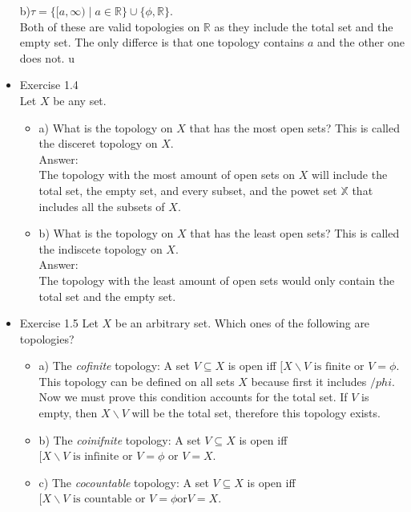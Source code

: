 \documentclass{article}
\begin{document}
\begin{itemize}
        b)$\tau = \{[a, \infty) \mid a \in \mathbb{R}\} \cup \{\phi, \mathbb{R}\}$. \\ 
        Both of these are valid topologies on $\mathbb{R}$ as they include the total set and the empty set. The only differce is that one topology contains $a$ and the other one does not. u
\item Exercise 1.4 \\
    Let $X$ be any set. 
        \begin{itemize}
            \item     a) What is the topology on $X$ that has the most open sets? This is called the disceret topology on $X$. 
                \\ Answer: 
                    \\ The topology with the most amount of open sets on $X$ will include the total set, the empty set, and every subset, and the powet set $\mathbb{X}$ that includes all the subsets of $X$. \\
            \item    b) What is the topology on $X$ that has the least open sets? This is called the indiscete topology on $X$. 
                \\ Answer:
                    \\ The topology with the least amount of open sets would only contain the total set and the empty set. 
            \end{itemize}
                
\item Exercise 1.5 Let $X$ be an arbitrary set. Which ones of the following are topologies?
        \begin{itemize}
            \item   a) The \textit{cofinite} topology: A set $V \subseteq X$ is open iff $[ X \backslash  V \text{ is finite or } V = \phi$.
                    This topology can be defined on all sets $X$ because first it includes $/phi$. Now we must prove this condition accounts for the total set. If $V$ is empty, then $X \backslash V$ will be the total set, therefore this topology exists. 
            \item   b) The \textit{coinifnite} topology: A set $V \subseteq X$ is open iff $[X \backslash V \text{ is infinite or } V = \phi \text{ or } V = X$. 
                
            \item   c) The \textit{cocountable} topology: A set $V \subseteq X$ is open iff $[X \backslash V \text{ is countable or  } V = \phi \text{or} V = X$.   
                             
        \end{itemize}
\end{itemize}
\end{document}
